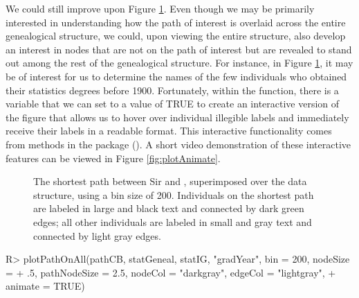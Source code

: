 \documentclass[article,shortnames]{jss}
\begin{document}
We could still improve upon Figure \ref{fig:plotCBNoText}. Even though we may be primarily interested in understanding how the path of interest is overlaid across the entire genealogical structure, we could, upon viewing the entire structure, also develop an interest in nodes that are not on the path of interest but are revealed to stand out among the rest of the genealogical structure. For instance, in Figure \ref{fig:plotCBNoText}, it may be of interest for us to determine the names of the few individuals who obtained their statistics degrees before 1900. Fortunately, within the  function, there is a variable  that we can set to a value of TRUE to create an interactive version of the figure that allows us to hover over individual illegible labels and immediately receive their labels in a readable format. This interactive functionality comes from methods in the  package (\citealt{plotly}). A short video demonstration of these interactive features can be viewed in Figure \ref{fig:plotAnimate}.

\begin{figure}[H]
    \centering
    \caption{The shortest path between Sir  and , superimposed over the data structure, using a bin size of 200. Individuals on the shortest path are labeled in large and black text and connected by dark green edges; all other individuals are labeled in small and gray text and connected by light gray edges.}
    \label{fig:plotCBNoText}
\end{figure}

\begin{CodeChunk}
\begin{CodeInput}
R> plotPathOnAll(pathCB, statGeneal, statIG, "gradYear", bin = 200, nodeSize =
+    .5, pathNodeSize = 2.5, nodeCol = "darkgray", edgeCol = "lightgray",
+    animate = TRUE)
\end{CodeInput}
\end{CodeChunk}
\end{document}
